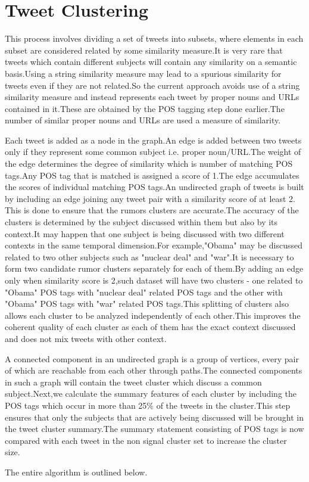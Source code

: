 \section{Tweet Clustering}
This process involves dividing a set of tweets into subsets, where elements in each subset are considered related by some similarity measure.It is very rare that tweets which contain different subjects will contain any similarity on a semantic basis.Using a string similarity measure may lead  to a spurious similarity for tweets even if they are not related.So the current approach avoids use of a string similarity measure and instead represents each tweet by proper nouns and URLs contained in it.These are obtained by the POS tagging step done earlier.The number of similar proper nouns and URLs are used a measure of similarity.
\\
\par
Each tweet is added as a node in the graph.An edge is added between two tweets only if they represent some common subject i.e. proper noun/URL.The weight of the edge determines the degree of similarity which is number of matching POS tags.Any POS tag that is matched is assigned a score of 1.The edge accumulates the scores of individual matching POS tags.An undirected graph of tweets is built by including an edge joining any tweet pair with a similarity score of at least 2.
This is done to ensure that the rumors clusters are accurate.The accuracy of the clusters is determined by the subject discussed within them but also by its context.It may happen that one subject is being discussed with two different contexts in the same temporal dimension.For example,"Obama" may be discussed related to two other subjects such as "nuclear deal" and "war".It is necessary to form two candidate rumor clusters separately for each of them.By adding an edge only when similarity score is 2,such dataset will have two clusters - one related to "Obama" POS tags with "nuclear deal" related POS tags and the other with "Obama" POS tags with "war" related POS tags.This splitting of clusters also allows each cluster to be analyzed independently of each other.This improves the coherent quality of each cluster as each of them has the exact context discussed and does not mix tweets with other context.      
\\
\par
A connected component in an undirected	 graph is a group of vertices, every pair of which are reachable from each other through paths.The connected components in such a graph will contain the tweet cluster which discuss a common subject.Next,we calculate the summary features of each cluster by including the POS tags which occur in more than 25\% of the tweets in the cluster.This step ensures that only the subjects that are actively being discussed will be brought in the tweet cluster summary.The summary statement consisting of POS tags is now compared with each tweet in the non signal cluster set to increase the cluster size.	  
\\
\par
The entire algorithm is outlined below.

